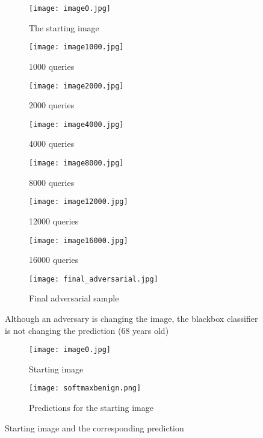 \begin{figure}
\begin{subfigure}{.5\textwidth}
  \centering%
  \texttt{[image: image0.jpg]}
  \caption{The starting image}
\end{subfigure}
\begin{subfigure}{.5\textwidth}
  \centering
  \texttt{[image: image1000.jpg]}
  \caption{1000 queries}
\end{subfigure}

\begin{subfigure}{.5\textwidth}
  \centering
  \texttt{[image: image2000.jpg]}
  \caption{2000 queries}
\end{subfigure}
\begin{subfigure}{.5\textwidth}
  \centering
  \texttt{[image: image4000.jpg]}
  \caption{4000 queries}
\end{subfigure}

\begin{subfigure}{.5\textwidth}
  \centering
  \texttt{[image: image8000.jpg]}
  \caption{8000 queries}
\end{subfigure}
\begin{subfigure}{.5\textwidth}
  \centering
  \texttt{[image: image12000.jpg]}
  \caption{12000 queries}
\end{subfigure}

\begin{subfigure}{.5\textwidth}
  \centering
  \texttt{[image: image16000.jpg]}
  \caption{16000 queries}
\end{subfigure}
\begin{subfigure}{.5\textwidth}
  \centering
  \texttt{[image: final\_adversarial.jpg]}
  \caption{Final adversarial sample}
\end{subfigure}
\caption{Although an adversary is changing the image, the blackbox classifier is not changing the prediction (68 years old)}
\label{fig:trump-adv}
\end{figure}

\begin{figure}
\begin{subfigure}{.5\textwidth}
  \centering
  \texttt{[image: image0.jpg]}
  \caption{Starting image}
\end{subfigure}
\begin{subfigure}{.5\textwidth}
  \centering
  \texttt{[image: softmaxbenign.png]}
  \caption{Predictions for the starting image}
\end{subfigure}
\caption{Starting image and the corresponding prediction}
\label{fig:starting-image-softmax}
\end{figure}

